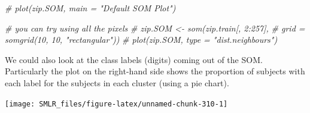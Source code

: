 \documentclass[
]{book}
\newenvironment{Shaded}{\begin{snugshade}}{\end{snugshade}}
\newcommand{\AttributeTok}[1]{\textcolor[rgb]{0.13,0.29,0.53}{#1}}
\newcommand{\CommentTok}[1]{\textcolor[rgb]{0.56,0.35,0.01}{\textit{#1}}}
\newcommand{\DecValTok}[1]{\textcolor[rgb]{0.00,0.00,0.81}{#1}}
\newcommand{\DocumentationTok}[1]{\textcolor[rgb]{0.56,0.35,0.01}{\textbf{\textit{#1}}}}
\newcommand{\FunctionTok}[1]{\textcolor[rgb]{0.13,0.29,0.53}{\textbf{#1}}}
\newcommand{\NormalTok}[1]{#1}
\newcommand{\OtherTok}[1]{\textcolor[rgb]{0.56,0.35,0.01}{#1}}
\newcommand{\SpecialCharTok}[1]{\textcolor[rgb]{0.81,0.36,0.00}{\textbf{#1}}}
\newcommand{\StringTok}[1]{\textcolor[rgb]{0.31,0.60,0.02}{#1}}
\theoremstyle{definition}
\theoremstyle{definition}
\theoremstyle{definition}
\theoremstyle{definition}
\theoremstyle{remark}
\begin{document}
\begin{Shaded}
\begin{Highlighting}[]
  \CommentTok{\# plot(zip.SOM, main = "Default SOM Plot")}
  
  \CommentTok{\# you can try using all the pixels}
  \CommentTok{\# zip.SOM \textless{}{-} som(zip.train[, 2:257], }
  \CommentTok{\#            grid = somgrid(10, 10, "rectangular"))}
  \CommentTok{\# plot(zip.SOM, type = "dist.neighbours")}
\end{Highlighting}
\end{Shaded}

We could also look at the class labels (digits) coming out of the SOM. Particularly the plot on the right-hand side shows the proportion of subjects with each label for the subjects in each cluster (using a pie chart).

\begin{Shaded}
\end{Shaded}

\begin{center}\texttt{[image: SMLR\_files/figure-latex/unnamed-chunk-310-1]} \end{center}
\end{document}
